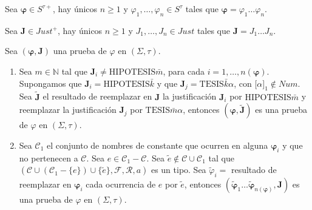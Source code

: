   \begin{lemma} \label{lemma_68}
    \PN Sea $\pmb{\varphi} \in S^{\tau +}$, hay únicos $n \geq 1$ y $\varphi_{1}, \dotsc, \varphi_{n} \in S^{\tau}$
    tales que $\pmb{\varphi} = \varphi_{1} \dotsc \varphi_{n}$.
  \end{lemma}

  \begin{lemma} \label{lemma_69}
    \PN Sea $\mathbf{J} \in Just^{+}$, hay únicos $n \geq 1$ y $J_{1}, \dotsc, J_{n} \in Just$ tales que $\mathbf{J} =
    J_{1} \dotsc J_{n}$.
  \end{lemma}

  \begin{lemma} \label{lemma_70}
    \PN Sea $(\pmb{\varphi}, \mathbf{J})$ una prueba de $\varphi$ en $(\Sigma, \tau)$.
    \begin{enumerate}
      \item Sea $m \in \mathbb{N}$ tal que $\mathbf{J}_{i} \neq \mathrm{HIPOTESIS}\bar{m}$, para cada $i = 1, \dotsc,
      n(\pmb{\varphi})$. Supongamos que $\mathbf{J}_{i} = \mathrm{HIPOTESIS}\bar{k}$ y que $\mathbf{J}_{j} =
      \mathrm{TESIS}\bar{k} \alpha$, con $\lbrack\alpha\rbrack_{1} \notin Num$. Sea $\mathbf{\tilde{J}}$ el resultado de
      reemplazar en $\mathbf{J}$ la justificación $\mathbf{J}_{i}$ por $\mathrm{HIPOTESIS}\bar{m}$ y reemplazar la
      justificación $\mathbf{J}_{j}$ por $\mathrm{TESIS}\bar{m}\alpha$, entonces $(\pmb{\varphi}, \mathbf{\tilde{J}})$
      es una prueba de $\varphi$ en $(\Sigma, \tau)$.
      \item Sea $\mathcal{C}_{1}$ el conjunto de nombres de constante que ocurren en alguna $\pmb{\varphi}_{i}$ y que
      no pertenecen a $\mathcal{C}$. Sea $e \in \mathcal{C}_{1}-\mathcal{C}$. Sea $\tilde{e} \notin \mathcal{C} \cup
      \mathcal{C}_{1}$ tal que $(\mathcal{C} \cup (\mathcal{C}_{1}-\{e\}) \cup \{\tilde{e}\}, \mathcal{F}, \mathcal{R},
      a)$ es un tipo. Sea $\tilde{\varphi}_{i} =$ resultado de reemplazar en $\pmb{\varphi}_{i}$ cada ocurrencia de
      $e$ por $\tilde{e}$, entonces $(\pmb{\tilde{\varphi}}_{1} \dotsc \pmb{\tilde{\varphi}}_{n(\mathbf{\varphi})},
      \mathbf{J})$ es una prueba de $\varphi$ en $(\Sigma, \tau)$.
    \end{enumerate}
  \end{lemma}


